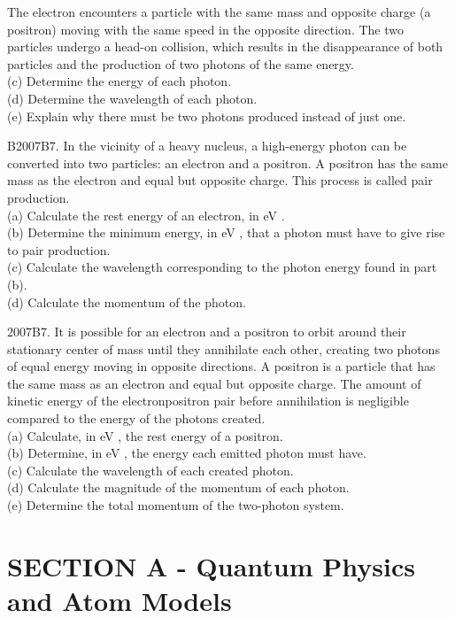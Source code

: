\begin{enumerate}
The electron encounters a particle with the same mass and opposite charge (a positron) moving with the same speed in the opposite direction. The two particles undergo a head-on collision, which results in the disappearance of both particles and the production of two photons of the same energy.\\
(c) Determine the energy of each photon.\\
(d) Determine the wavelength of each photon.\\
(e) Explain why there must be two photons produced instead of just one.

B2007B7. In the vicinity of a heavy nucleus, a high-energy photon can be converted into two particles: an electron and a positron. A positron has the same mass as the electron and equal but opposite charge. This process is called pair production.\\
(a) Calculate the rest energy of an electron, in eV .\\
(b) Determine the minimum energy, in eV , that a photon must have to give rise to pair production.\\
(c) Calculate the wavelength corresponding to the photon energy found in part (b).\\
(d) Calculate the momentum of the photon.

2007B7. It is possible for an electron and a positron to orbit around their stationary center of mass until they annihilate each other, creating two photons of equal energy moving in opposite directions. A positron is a particle that has the same mass as an electron and equal but opposite charge. The amount of kinetic energy of the electronpositron pair before annihilation is negligible compared to the energy of the photons created.\\
(a) Calculate, in eV , the rest energy of a positron.\\
(b) Determine, in eV , the energy each emitted photon must have.\\
(c) Calculate the wavelength of each created photon.\\
(d) Calculate the magnitude of the momentum of each photon.\\
(e) Determine the total momentum of the two-photon system.

\section*{SECTION A - Quantum Physics and Atom Models}

\end{enumerate}
